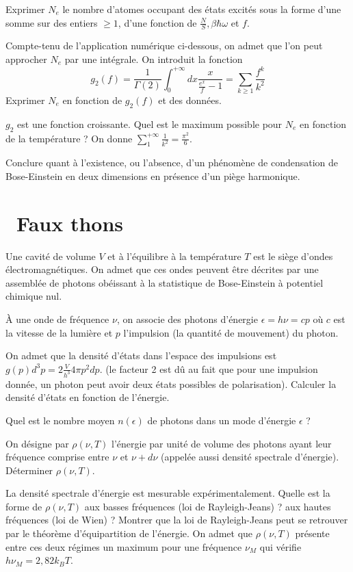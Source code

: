 \documentclass[utf8, 11pt]{feuille}
\begin{document}
\question
Exprimer $N_e$ le nombre d'atomes occupant des états excités sous la forme d'une somme sur des entiers $\geq 1$, d'une fonction de $\frac{N}{S}, \beta \hbar \omega$ et $f$. 

\question
Compte-tenu de l'application numérique ci-dessous, on admet que l'on peut approcher $N_e$ par une intégrale. On introduit la fonction
$$
g_2(f)=\frac{1}{\Gamma(2)} \int_0^{+\infty} dx \frac{x}{\frac{e^x}{f}-1} = \sum_{k\geq 1} \frac{f^k}{k^2}
$$
Exprimer $N_e$ en fonction de $g_2(f)$ et des données.

\question
$g_2$ est une fonction croissante. Quel est le maximum possible pour $N_e$ en fonction de la température ?  On donne $\sum_1^{+\infty} \frac{1}{k^2}=\frac{\pi^2}{6}$.

\question
Conclure quant à l'existence, ou l'absence, d'un phénomène de condensation de Bose-Einstein en deux dimensions en présence d'un piège harmonique.



\section{\hard~Faux thons}
Une cavité de volume $V$ et à l'équilibre à la température $T$  est le siège d'ondes électromagnétiques. On admet que ces ondes peuvent être décrites par une assemblée de photons obéissant à la statistique de Bose-Einstein à potentiel chimique nul. 

\`A une onde de fréquence $\nu$, on associe des photons d'énergie $\epsilon=h \nu= cp$ où $c$ est la vitesse de la lumière et $p$ l'impulsion (la quantité de mouvement) du photon.

\question
On admet que la densité d'états dans l'espace des impulsions est $g(p) d^3p =2 \frac{V}{h^3} 4 \pi p^2 dp$. (le facteur 2 est dû au fait que pour une impulsion donnée, un photon peut avoir deux états possibles de polarisation). Calculer la densité d'états en fonction de l'énergie.

\question
Quel est le nombre moyen   $n(\epsilon)$ de photons dans un mode d'énergie $\epsilon$ ?

\question
On désigne par $\rho(\nu, T)$ l'énergie par unité de volume des photons ayant leur fréquence comprise entre $\nu$ et $\nu+d\nu$ (appelée aussi densité spectrale d'énergie). Déterminer $\rho(\nu, T)$.

\question
La densité spectrale d'énergie est mesurable expérimentalement. Quelle est la forme de $\rho(\nu, T)$ aux basses fréquences (loi de Rayleigh-Jeans) ?  aux hautes fréquences (loi de Wien) ? Montrer que la loi de Rayleigh-Jeans peut se retrouver par le théorème d'équipartition de l'énergie. On admet que $\rho(\nu, T)$ présente entre ces deux régimes un maximum pour une fréquence $\nu_M$ qui vérifie $h \nu_M=2,82 k_B T$.
\end{document}
